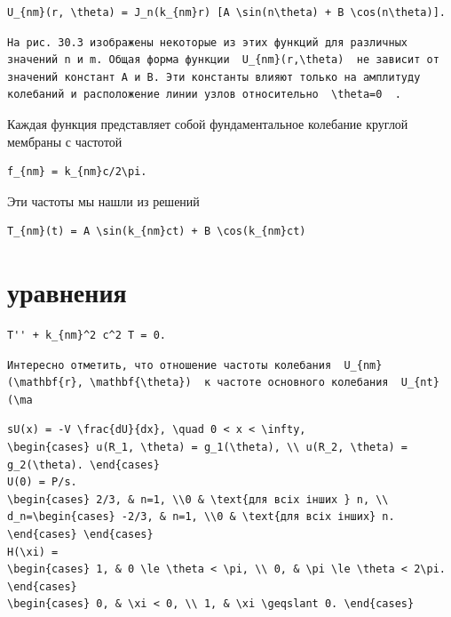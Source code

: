 \documentclass[
  ukrainian,
]{article}
\begin{document}
\begin{verbatim}
U_{nm}(r, \theta) = J_n(k_{nm}r) [A \sin(n\theta) + B \cos(n\theta)].
\end{verbatim}

\begin{verbatim}
На рис. 30.3 изображены некоторые из этих функций для различных значений n и m. Общая форма функции  U_{nm}(r,\theta)  не зависит от значений констант A и B. Эти константы влияют только на амплитуду колебаний и расположение линии узлов относительно  \theta=0  .
\end{verbatim}

Каждая функция представляет собой фундаментальное колебание круглой
мембраны с частотой

\begin{verbatim}
f_{nm} = k_{nm}c/2\pi.
\end{verbatim}

Эти частоты мы нашли из решений

\begin{verbatim}
T_{nm}(t) = A \sin(k_{nm}ct) + B \cos(k_{nm}ct)
\end{verbatim}

\section{уравнения}\label{ux443ux440ux430ux432ux43dux435ux43dux438ux44f}

\begin{verbatim}
T'' + k_{nm}^2 c^2 T = 0.
\end{verbatim}

\begin{verbatim}
Интересно отметить, что отношение частоты колебания  U_{nm}(\mathbf{r}, \mathbf{\theta})  к частоте основного колебания  U_{nt}(\ma
\end{verbatim}

\begin{verbatim}
sU(x) = -V \frac{dU}{dx}, \quad 0 < x < \infty,
\begin{cases} u(R_1, \theta) = g_1(\theta), \\ u(R_2, \theta) = g_2(\theta). \end{cases}
U(0) = P/s.
\begin{cases} 2/3, & n=1, \\0 & \text{для всіх інших } n, \\ d_n=\begin{cases} -2/3, & n=1, \\0 & \text{для всіх інших} n. \end{cases} \end{cases}
H(\xi) =
\begin{cases} 1, & 0 \le \theta < \pi, \\ 0, & \pi \le \theta < 2\pi. \end{cases}
\begin{cases} 0, & \xi < 0, \\ 1, & \xi \geqslant 0. \end{cases}
\end{verbatim}
\end{document}
